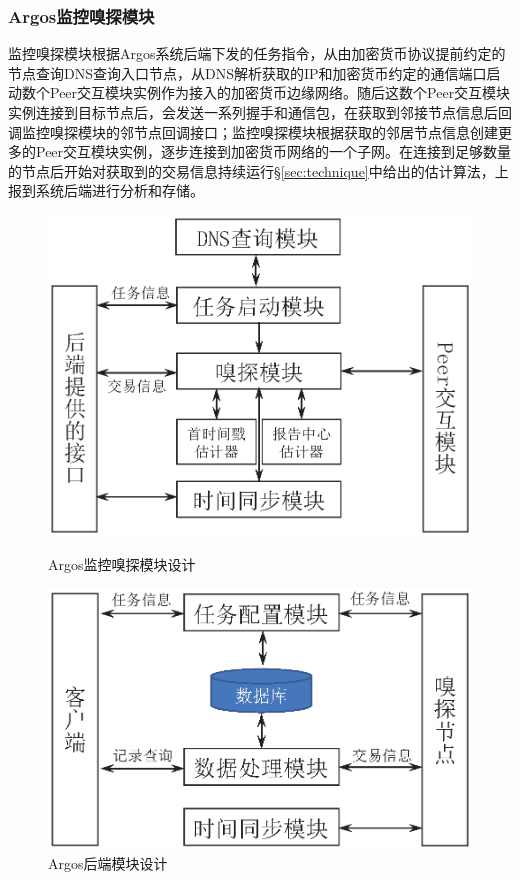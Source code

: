 \documentclass[supercite]{HustGraduPaper}
\theoremstyle{definition}
\begin{document}
\subsubsection{Argos监控嗅探模块}
监控嗅探模块根据Argos系统后端下发的任务指令，从由加密货币协议提前约定的节点查询DNS查询入口节点，从DNS解析获取的IP和加密货币约定的通信端口启动数个Peer交互模块实例作为接入的加密货币边缘网络。随后这数个Peer交互模块实例连接到目标节点后，会发送一系列握手和通信包，在获取到邻接节点信息后回调监控嗅探模块的邻节点回调接口；监控嗅探模块根据获取的邻居节点信息创建更多的Peer交互模块实例，逐步连接到加密货币网络的一个子网。在连接到足够数量的节点后开始对获取到的交易信息持续运行\S \ref{sec:technique}中给出的估计算法，上报到系统后端进行分析和存储。
\begin{figure}[H]
  \centering
  \begin{minipage}{0.48\textwidth}
    \centering
    \includegraphics[width=\linewidth]{images/3.3-sniffer.ps}
    \caption{Argos监控嗅探模块设计}\label{fig:module:sniffer}
  \end{minipage}\hfill
  \begin{minipage}{0.48\textwidth}
    \centering
    \includegraphics[width=\linewidth]{images/3.3-master.ps}
    \caption{Argos后端模块设计}\label{fig:module:master}
  \end{minipage}
\end{figure}
\end{document}
